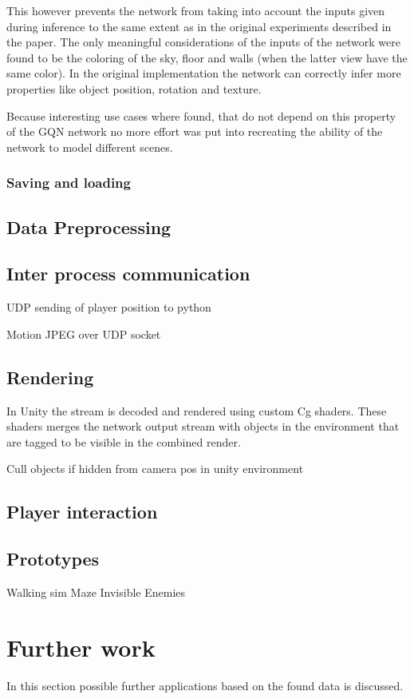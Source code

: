 \documentclass[a4paper, twoside, 10pt]{report}
\begin{document}
This however prevents the network from taking into account the inputs given during inference to the same extent as in the original experiments described in the paper. The only meaningful considerations of the inputs of the network were found to be the coloring of the sky, floor and walls (when the latter view have the same color). In the original implementation the network can correctly infer more properties like object position, rotation and texture.

Because interesting use cases where found, that do not depend on this property of the GQN network no more effort was put into recreating the ability of the network to model different scenes.

\subsection{Saving and loading}
\section{Data Preprocessing}
\section{Inter process communication}
UDP sending of player position to python

Motion JPEG over UDP socket 

\section{Rendering}
In Unity the stream is decoded and rendered using custom Cg shaders. These shaders merges the network output stream with objects in the environment that are tagged to be visible in the combined render.

Cull objects if hidden from camera pos in unity environment

\section{Player interaction}
\section{Prototypes}
Walking sim
Maze
Invisible Enemies

\chapter{Further work}
In this section possible further applications based on the found data is discussed.
\end{document}

